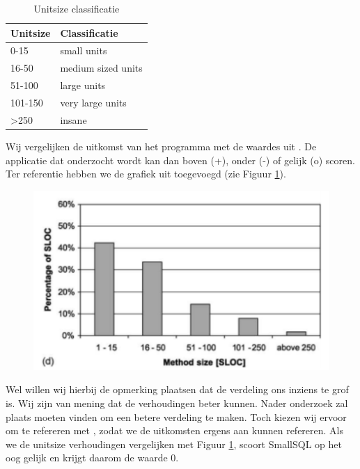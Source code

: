 \documentclass[a4paper]{article}
\begin{document}
\begin{table}[h]
\caption{Unitsize classificatie}
\label{tbl:UnitSizeClassificatie}
\begin{tabular}{|l|l|}
\hline
Unitsize         & Classificatie      \\ \hline
0-15             & small units        \\
16-50            & medium sized units \\
51-100           & large units        \\
101-150          & very large units   \\
\textgreater{}250& insane             \\ \hline
\end{tabular}
\end{table}

Wij vergelijken de uitkomst van het programma met de waardes uit \cite{B}. De applicatie dat onderzocht wordt kan dan boven (+), onder (-) of gelijk (o) scoren. Ter referentie hebben we de grafiek uit \cite{B} toegevoegd (zie Figuur \ref{fig:RefVerdeling}).
\begin{figure}[htbp]
\centering
\includegraphics[width=0.8 \textwidth]{Capture.png}
\label{fig:RefVerdeling}
\end{figure}

Wel willen wij hierbij de opmerking plaatsen dat de verdeling ons inziens te grof is. Wij zijn van mening dat de verhoudingen beter kunnen. Nader onderzoek zal plaats moeten vinden om een betere verdeling te maken. Toch kiezen wij ervoor om te refereren met \cite{B}, zodat we de uitkomsten ergens aan kunnen refereren. Als we de unitsize verhoudingen vergelijken met Figuur \ref{fig:RefVerdeling}, scoort SmallSQL op het oog gelijk en krijgt daarom de waarde 0.
\end{document}
